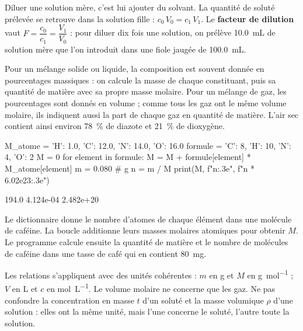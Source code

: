 \begin{propriete}[Dilution]
Diluer une solution mère, c'est lui ajouter du solvant. La quantité de soluté prélevée se retrouve dans la solution
fille : $c_0\,V_0=c_1\,V_1$. Le \textbf{facteur de dilution} vaut $F=\dfrac{c_0}{c_1}=\dfrac{V_1}{V_0}$ : pour diluer dix fois une solution, on prélève
\qty{10,0}{mL} de solution mère que l'on introduit dans une fiole jaugée de \qty{100,0}{mL}.
\end{propriete}
\begin{propriete}
Pour un mélange solide ou liquide, la composition est souvent donnée en pourcentages massiques : on calcule la masse de
chaque constituant, puis sa quantité de matière avec sa propre masse molaire. Pour un mélange de gaz, les pourcentages
sont donnés en volume ; comme tous les gaz ont le même volume molaire, ils indiquent aussi la part de chaque gaz en
quantité de matière. L'air sec contient ainsi environ 78~\% de diazote et 21~\% de dioxygène.
\end{propriete}
\begin{codecote}[0.62]
\begin{pythoncol}
M_atome = {'H': 1.0, 'C': 12.0,
           'N': 14.0, 'O': 16.0}
formule = {'C': 8, 'H': 10, 'N': 4, 'O': 2}
M = 0
for element in formule:
    M = M + formule[element] * M_atome[element]
m = 0.080                        # g
n = m / M
print(M, f"{n:.3e}", f"{n * 6.02e23:.3e}")
\end{pythoncol}
\begin{consolecol}
194.0 4.124e-04 2.482e+20
\end{consolecol}
\cote
\fontsize{9.5}{12.5}\selectfont
{}\par\smallskip
Le dictionnaire  donne le nombre d'atomes de chaque élément dans une molécule de caféine. La boucle
additionne leurs masses molaires atomiques pour obtenir $M$. Le programme calcule ensuite la quantité de matière et le
nombre de molécules de caféine dans une tasse de café qui en contient \qty{80}{mg}.
\end{codecote}
\begin{attention}
Les relations s'appliquent avec des unités cohérentes : $m$ en g et $M$ en \unit{g.mol^{-1}} ; $V$ en L et $c$ en \unit{mol.L^{-1}}. Le volume molaire
ne concerne que les gaz. Ne pas confondre la concentration en masse $t$ d'un soluté et la masse volumique $\rho$ d'une
solution : elles ont la même unité, mais l'une concerne le soluté, l'autre toute la solution.
\end{attention}
